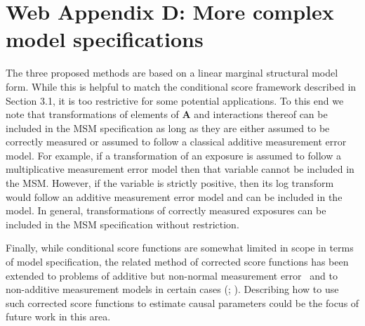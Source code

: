 \documentclass[12pt]{article}
\begin{document}
\section{Web Appendix D: More complex model specifications}

The three proposed methods are based on a linear marginal structural model form. While this is helpful to match the conditional score framework described in Section 3.1, it is too restrictive for some potential applications. To this end we note that transformations of elements of $\bm{A}$ and interactions thereof can be included in the MSM specification as long as they are either assumed to be correctly measured or assumed to follow a classical additive measurement error model. For example, if a transformation of an exposure is assumed to follow a multiplicative measurement error model then that variable cannot be included in the MSM. However, if the variable is strictly positive, then its log transform would follow an additive measurement error model and can be included in the model. In general, transformations of correctly measured exposures can be included in the MSM specification without restriction.

Finally, while conditional score functions are somewhat limited in scope in terms of model specification, the related method of corrected score functions has been extended to problems of additive but non-normal measurement error~\citep{buzas1996} and to non-additive measurement models in certain cases (\citealp{nakamura1990}; \citealp*{li2004}). Describing how to use such corrected score functions to estimate causal parameters could be the focus of future work in this area.



\end{document}
